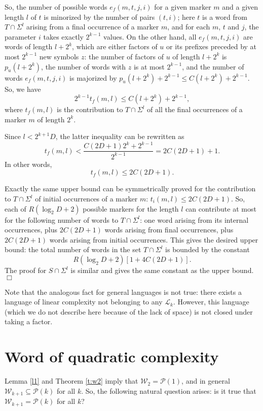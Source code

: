 \documentclass[runningheads,envcountsect,envcountsame]{llncs}
\begin{document}
\medskip
So, the number of possible words $e_f(m,t,j,i)$ for a given marker $m$ and a given length $l$ of $t$ is minorized by the number of pairs $(t,i)$; here $t$ is a word from $T \cap \Sigma^l$ arising from a final occurrence of a marker $m$, and for each $m$, $t$ and $j$, the parameter $i$ takes exactly $2^{k-1}$ values. On the other hand, all $e_f(m,t,j,i)$ are words of length $l+2^k$, which are either factors of $u$ or its prefixes preceded by at most $2^{k-1}$ new symbols $z$: the number of factors of $u$ of length $l+2^k$ is $p_u(l+2^k)$, the number of words with $z$ is at most $2^{k-1}$, and the number of words $e_f(m,t,j,i)$ is majorized by $p_u(l+2^k)+2^{k-1}\leq C(l+2^k)+2^{k-1}$. So, we have
\[2^{k-1} t_f(m,l) \leq C(l+2^k)+2^{k-1},\]
where $t_f(m,l)$ is the contribution to $T\cap \Sigma^l $ of all the final occurrences of a marker $m$ of length $2^k$.

Since $l< 2^{k+1}D$, the latter inequality can be rewritten as
\[t_f(m,l)< \frac{C(2D+1)2^k+2^{k-1}}{2^{k-1}}=2C (2D+1)+1.\]
In other words,
\[t_f(m,l)\leq 2C (2D+1).\]

Exactly the same upper bound can be symmetrically proved for the contribution to $T \cap \Sigma^l$ of initial occurrences of a marker $m$: $t_i(m,l)\leq 2C (2D+1)$. So, each of $R(\log_2 D+2)$ possible markers for the length $l$ can contribute at most for the following number of words to $T \cap \Sigma^l$: one word arising from its internal occurrences, plus $2C (2D+1)$ words arising from final occurrences, plus $2C (2D+1)$ words arising from initial occurrences. This gives the desired upper bound: the total number of words in the set $T \cap \Sigma^l$ is bounded by the constant
\[R(\log_2 D +2)[1+4C (2D+1)].\]
The proof for $S \cap \Sigma^l$ is similar and gives the same constant as the upper bound. \hfill $\Box$

\medskip
Note that the analogous fact for general languages is not true: there exists a language of linear complexity not belonging to any $\mathcal L_k$. However, this language (which we do not describe here because of the lack of space) is not closed under taking a factor.
\section{Word of quadratic complexity}

Lemma \ref{l1} and Theorem  \ref{t:w2} imply that $\mathcal
W_2=\mathcal P(1)$, and in general $\mathcal W_{k+1} \subseteq
\mathcal P(k)$ for all $k$. So, the following natural question
arises: is it true that $\mathcal W_{k+1}=\mathcal P(k)$ for all
$k$?
\end{document}

